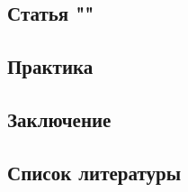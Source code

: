\documentclass{article}
\begin{document}
    \newpage
    \begin{center} 
    \section{Статья ""}
    \end{center} 
    
    \newpage
    \begin{center} 
    \section{Практика}
    \end{center} 
    
    \newpage
    \begin{center} 
    \section{Заключение}
    \end{center} 
    
    \newpage
    \begin{center} 
    \section{Список литературы}
    \end{center} 
    
\end{document}
